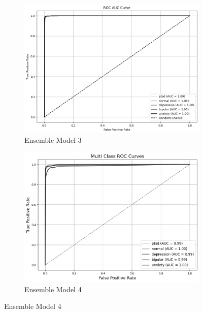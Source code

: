 \begin{figure}[H]
\begin{subfigure}[b]{0.47\textwidth}
        \label{em2 roc}  %
    \end{subfigure}
    \hfill
    \begin{subfigure}[b]{0.47\textwidth}
        \centering
        \includegraphics[width=\textwidth]{Images/EM3 ROC.png}
        \caption{Ensemble Model 3}
        \label{em3 roc}  %
    \end{subfigure}
    \hfill
    \begin{subfigure}[b]{0.48\textwidth}
        \centering
        \includegraphics[width=\textwidth]{Images/BAG ROC.png}
        \caption{Ensemble Model 4}
        \label{bag roc}  %
    \end{subfigure}

\end{figure}
